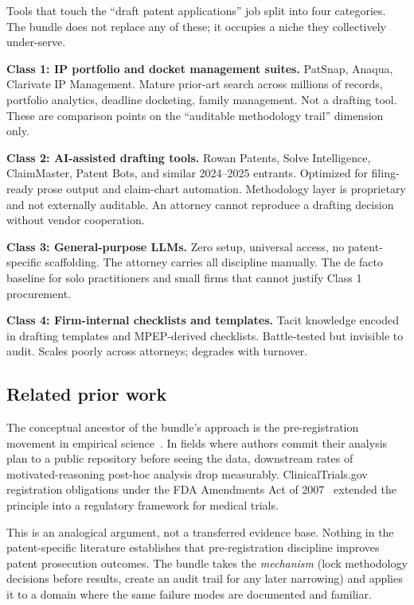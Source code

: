 \documentclass[11pt,letterpaper]{article}
\begin{document}
Tools that touch the ``draft patent applications'' job split into
four categories. The bundle does not replace any of these; it
occupies a niche they collectively under-serve.

\textbf{Class 1: IP portfolio and docket management suites.} PatSnap,
Anaqua, Clarivate IP Management. Mature prior-art search across
millions of records, portfolio analytics, deadline docketing, family
management. Not a drafting tool. These are comparison points on the
``auditable methodology trail'' dimension only.

\textbf{Class 2: AI-assisted drafting tools.} Rowan Patents, Solve
Intelligence, ClaimMaster, Patent Bots, and similar 2024--2025
entrants. Optimized for filing-ready prose output and claim-chart
automation. Methodology layer is proprietary and not externally
auditable. An attorney cannot reproduce a drafting decision without
vendor cooperation.

\textbf{Class 3: General-purpose LLMs.} Zero setup, universal access,
no patent-specific scaffolding. The attorney carries all discipline
manually. The de facto baseline for solo practitioners and small
firms that cannot justify Class 1 procurement.

\textbf{Class 4: Firm-internal checklists and templates.} Tacit
knowledge encoded in drafting templates and MPEP-derived checklists.
Battle-tested but invisible to audit. Scales poorly across attorneys;
degrades with turnover.

\subsection{Related prior work}

The conceptual ancestor of the bundle's approach is the
pre-registration movement in empirical science~\citep{nosek2018}. In
fields where authors commit their analysis plan to a public
repository before seeing the data, downstream rates of
motivated-reasoning post-hoc analysis drop measurably.
ClinicalTrials.gov registration obligations under the FDA Amendments
Act of 2007~\citep{fdaaa2007} extended the principle into a
regulatory framework for medical trials.

This is an analogical argument, not a transferred evidence base.
Nothing in the patent-specific literature establishes that
pre-registration discipline improves patent prosecution outcomes.
The bundle takes the \emph{mechanism} (lock methodology decisions
before results, create an audit trail for any later narrowing) and
applies it to a domain where the same failure modes are documented
and familiar.
\end{document}
